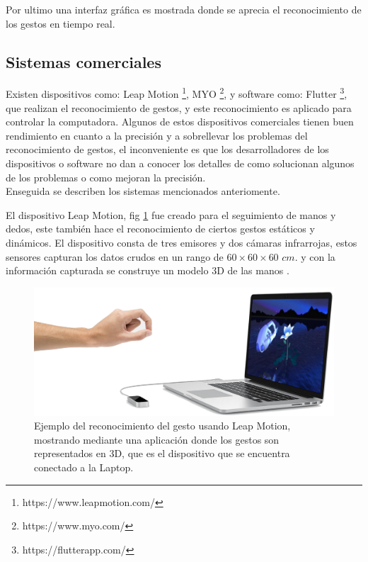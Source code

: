 Por ultimo una interfaz gráfica es mostrada donde se aprecia el reconocimiento de los gestos en tiempo real.  


 
\subsection{Sistemas comerciales}

Existen dispositivos como: Leap Motion \footnote{https://www.leapmotion.com/}, MYO \footnote{https://www.myo.com/}, y software como: Flutter \footnote{https://flutterapp.com/}, que realizan el reconocimiento de gestos, y este reconocimiento es aplicado para controlar la computadora. Algunos de estos dispositivos comerciales tienen  buen rendimiento en cuanto a la precisión y a sobrellevar los problemas del reconocimiento de gestos, el inconveniente es que los desarrolladores de los dispositivos o software no dan a conocer los detalles de como solucionan algunos de los problemas o como mejoran la precisión. \\ 
Enseguida se describen los sistemas mencionados anteriomente.

 
El dispositivo Leap Motion, fig \ref{fig:LeapMotion} fue creado para el seguimiento de manos y dedos, este también hace el reconocimiento de ciertos gestos estáticos y dinámicos. El dispositivo consta de tres emisores y dos cámaras infrarrojas, estos sensores capturan los datos crudos en un rango de $60 \times 60 \times 60$ $cm.$ y con la información capturada se construye un modelo 3D de las manos \citep{Weichert2013}. 

\begin{figure}[h!]
\begin{center}
\includegraphics[scale=.3]{./Figures/LeapMotion.png}
\end{center}
\caption{Ejemplo del reconocimiento del gesto usando Leap Motion, mostrando mediante una aplicación donde los gestos son representados en 3D, que es el dispositivo que se encuentra conectado a la Laptop.}
\label{fig:LeapMotion}
\end{figure}

